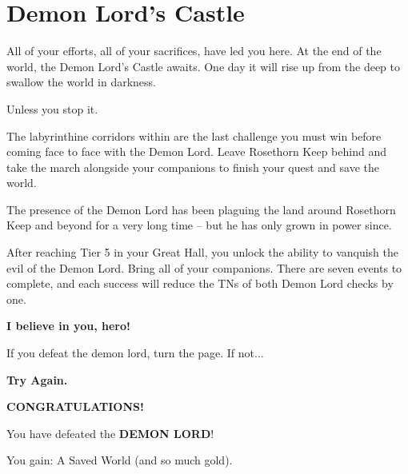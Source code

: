 \chapter{Demon Lord's Castle}

All of your efforts, all of your sacrifices, have led you here. At the end of the world, the Demon Lord’s Castle awaits. One day it will rise up from the deep to swallow the world in darkness.

\skipline

Unless you stop it.

\skipline

The labyrinthine corridors within are the last challenge you must win before coming face to face with the Demon Lord. Leave Rosethorn Keep behind and take the march alongside your companions to finish your quest and save the world.

\skipline

The presence of the Demon Lord has been plaguing the land around Rosethorn Keep and beyond for a very long time – but he has only grown in power since.

\skipline

After reaching Tier 5 in your Great Hall, you unlock the ability to vanquish the evil of the Demon Lord. Bring all of your companions. There are seven events to complete, and each success will reduce the TNs of both Demon Lord checks by one.

\skipline

\begin{adjustbox}{center}
	\textbf{I believe in you, hero!}
\end{adjustbox}

\vspace*{\fill}
\begin{adjustbox}{center}
\end{adjustbox}
\vspace*{0pt}
%

\pagebreak



If you defeat the demon lord, turn the page. If not...
\skipline
\skipline

\begin{adjustbox}{center}
	\textbf{Try Again.}
\end{adjustbox}

\pagebreak

\thispagestyle{empty}
\vspace*{\fill}
\begin{adjustbox}{center}
\end{adjustbox}
\begin{adjustbox}{center}
	\textbf{CONGRATULATIONS!}
\end{adjustbox}
\begin{adjustbox}{center}
	You have defeated the \textbf{DEMON LORD}!
\end{adjustbox}
\begin{adjustbox}{center}
	You gain: A Saved World (and so much gold).
\end{adjustbox}
\vspace*{\fill}
%




